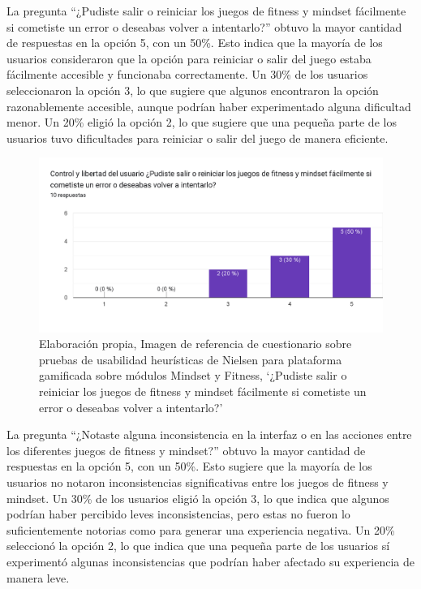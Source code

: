 La pregunta ``¿Pudiste salir o reiniciar los juegos de fitness y mindset fácilmente si cometiste un error o deseabas volver a intentarlo?'' obtuvo la mayor cantidad de respuestas en la opción 5, con un 50\%. Esto indica que la mayoría de los usuarios consideraron que la opción para reiniciar o salir del juego estaba fácilmente accesible y funcionaba correctamente. Un 30\% de los usuarios seleccionaron la opción 3, lo que sugiere que algunos encontraron la opción razonablemente accesible, aunque podrían haber experimentado alguna dificultad menor. Un 20\% eligió la opción 2, lo que sugiere que una pequeña parte de los usuarios tuvo dificultades para reiniciar o salir del juego de manera eficiente.

\begin{figure}[H]
  \centering
  \includegraphics[width=0.7\linewidth]{Imagenes/Nc3.png}
  \caption{Elaboración propia, Imagen de referencia de cuestionario sobre pruebas de usabilidad heurísticas de Nielsen para plataforma gamificada sobre módulos Mindset y Fitness, `¿Pudiste salir o reiniciar los juegos de fitness y mindset fácilmente si cometiste un error o deseabas volver a intentarlo?'}

  \label{fig:cuestionario3nielsen}
\end{figure}

La pregunta ``¿Notaste alguna inconsistencia en la interfaz o en las acciones entre los diferentes juegos de fitness y mindset?'' obtuvo la mayor cantidad de respuestas en la opción 5, con un 50\%. Esto sugiere que la mayoría de los usuarios no notaron inconsistencias significativas entre los juegos de fitness y mindset. Un 30\% de los usuarios eligió la opción 3, lo que indica que algunos podrían haber percibido leves inconsistencias, pero estas no fueron lo suficientemente notorias como para generar una experiencia negativa. Un 20\% seleccionó la opción 2, lo que indica que una pequeña parte de los usuarios sí experimentó algunas inconsistencias que podrían haber afectado su experiencia de manera leve.

